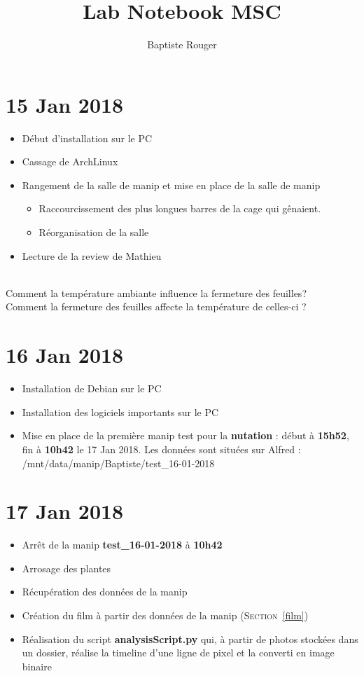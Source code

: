 \documentclass[10pt,a4paper]{article}
\author{Baptiste Rouger}
\title{Lab Notebook MSC}
\begin{document}
\maketitle

\tableofcontents

\newpage

\section{15 Jan 2018}

\begin{itemize}
\item Début d'installation sur le PC
\item Cassage de ArchLinux
\item Rangement de la salle de manip et mise en place de la salle de manip
	\begin{itemize}
	\item Raccourcissement des plus longues barres de la cage qui gênaient.
	\item Réorganisation de la salle
	\end{itemize}
\item Lecture de la review de Mathieu
\end{itemize}
~\\
\noindent Comment la température ambiante influence la fermeture des feuilles? \\
Comment la fermeture des feuilles affecte la température de celles-ci ?

\section{16 Jan 2018}
\begin{itemize}
\item Installation de Debian sur le PC
\item Installation des logiciels importants sur le PC
\item Mise en place de la première manip test pour la \textbf{nutation} : début à \textbf{15h52}, fin à \textbf{10h42} le 17 Jan 2018. Les données sont situées sur Alfred : /mnt/data/manip/Baptiste/test\_16-01-2018
\end{itemize}

\section{17 Jan 2018}
\begin{itemize}
\item Arrêt de la manip \textbf{test\_16-01-2018} à \textbf{10h42}
\item Arrosage des plantes
\item Récupération des données de la manip
\item Création du film à partir des données de la manip (\textsc{Section}~\ref{film})
\item Réalisation du script \textbf{analysisScript.py} qui, à partir de photos stockées dans un dossier, réalise la timeline d'une ligne de pixel et la converti en image binaire
\end{itemize}
\end{document}
